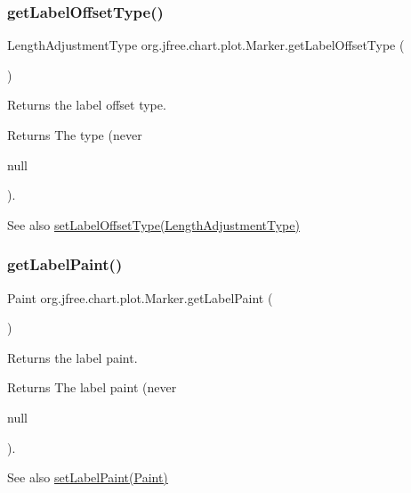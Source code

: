 \subsubsection{\texorpdfstring{get\+Label\+Offset\+Type()}{getLabelOffsetType()}}
{\footnotesize\ttfamily Length\+Adjustment\+Type org.\+jfree.\+chart.\+plot.\+Marker.\+get\+Label\+Offset\+Type (\begin{DoxyParamCaption}{ }\end{DoxyParamCaption})}

Returns the label offset type.

\begin{DoxyReturn}{Returns}
The type (never
\begin{DoxyCode}
null 
\end{DoxyCode}
 ).
\end{DoxyReturn}
\begin{DoxySeeAlso}{See also}
\mbox{\hyperlink{classorg_1_1jfree_1_1chart_1_1plot_1_1_marker_a587b510f9d7c24e7761992863f97a6bf}{set\+Label\+Offset\+Type(\+Length\+Adjustment\+Type)}} 
\end{DoxySeeAlso}
\mbox{\label{classorg_1_1jfree_1_1chart_1_1plot_1_1_marker_a25ff6c724ed30da3b8997d2bbca8ed25}} 
\subsubsection{\texorpdfstring{get\+Label\+Paint()}{getLabelPaint()}}
{\footnotesize\ttfamily Paint org.\+jfree.\+chart.\+plot.\+Marker.\+get\+Label\+Paint (\begin{DoxyParamCaption}{ }\end{DoxyParamCaption})}

Returns the label paint.

\begin{DoxyReturn}{Returns}
The label paint (never
\begin{DoxyCode}
null 
\end{DoxyCode}
 ).
\end{DoxyReturn}
\begin{DoxySeeAlso}{See also}
\mbox{\hyperlink{classorg_1_1jfree_1_1chart_1_1plot_1_1_marker_aa2076c2fb29d173c8484f736851e6a68}{set\+Label\+Paint(\+Paint)}} 
\end{DoxySeeAlso}
\mbox{\label{classorg_1_1jfree_1_1chart_1_1plot_1_1_marker_a24f2b2bcafa9ccc520dd4c52c074e985}} 
